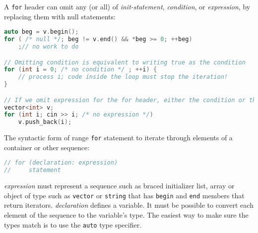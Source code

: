 A \texttt{for} header can omit any (or all) of \textit{init-statement}, \textit{condition}, or \textit{expression}, by replacing them with null statements:
\begin{lstlisting}[language=C++]
auto beg = v.begin(); 
for ( /* null */; beg != v.end() && *beg >= 0; ++beg) 
    ;// no work to do

// Omitting condition is equivalent to writing true as the condition
for (int i = 0; /* no condition */ ; ++i) { 
    // process i; code inside the loop must stop the iteration! 
}

// If we omit expression for the for header, either the condition or the body must do something to advance the iteration
vector<int> v; 
for (int i; cin >> i; /* no expression */) 
    v.push_back(i);
\end{lstlisting}

The syntactic form of range \texttt{for} statement to iterate through elements of a container or other sequence:
\begin{lstlisting}[language=C++]
// for (declaration: expression)
//     statement
\end{lstlisting}
\textit{expression} must represent a sequence such as braced initializer list, array or object of type such as \texttt{vector} or \texttt{string} that has \texttt{begin} and \texttt{end} members that return iterators. \textit{declaration} defines a variable. It must be possible to convert each element of the sequence to the variable's type. The easiest way to make sure the types match is to use the \texttt{auto} type specifier. 







